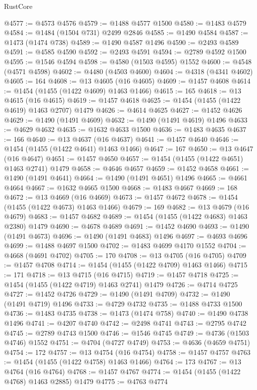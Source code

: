 \begin{lexlean}{RustCore}
\begin{coremodule}
@4577 := @4573 @4576
@4579 := @1488 @4577 @1500
@4580 := @1483 @4579
@4584 := @1484 (@1504 @731) @2499 @2846
@4585 := @1490 @4584
@4587 := @1473 (@1474 @738)
@4589 := @1490 @4587 @1496
@4590 := @2493 @4589
@4591 := @4585 @4590
@4592 := @2493 @4591
@4594 := @2789 @4592 @1500
@4595 := @1546 @4594
@4598 := @4580 (@1503 @4595) @1552
@4600 := @4548 (@4571 @4598)
@4602 := @4480 (@4503 @4600)
@4604 := @4318 (@4341 @4602)
@4605 := 164
@4608 := @13 @4605 (@16 @4605)
@4609 := @1457 @4608
@4614 := @1454 (@1455 (@1422 @4609) @1463 @1466)
@4615 := 165
@4618 := @13 @4615 (@16 @4615)
@4619 := @1457 @4618
@4625 := @1454 (@1455 (@1422 @4619) @1463 @2707) @1479
@4626 := @4614 @4625
@4627 := @1452 @4626
@4629 := @1490 (@1491 @4609)
@4632 := @1490 (@1491 @4619) @1496
@4633 := @4629 @4632
@4635 := @1632 @4633 @1500
@4636 := @1483 @4635
@4637 := 166
@4640 := @13 @4637 (@16 @4637)
@4641 := @1457 @4640
@4646 := @1454 (@1455 (@1422 @4641) @1463 @1466)
@4647 := 167
@4650 := @13 @4647 (@16 @4647)
@4651 := @1457 @4650
@4657 := @1454 (@1455 (@1422 @4651) @1463 @2741) @1479
@4658 := @4646 @4657
@4659 := @1452 @4658
@4661 := @1490 (@1491 @4641)
@4664 := @1490 (@1491 @4651) @1496
@4665 := @4661 @4664
@4667 := @1632 @4665 @1500
@4668 := @1483 @4667
@4669 := 168
@4672 := @13 @4669 (@16 @4669)
@4673 := @1457 @4672
@4678 := @1454 (@1455 (@1422 @4673) @1463 @1466)
@4679 := 169
@4682 := @13 @4679 (@16 @4679)
@4683 := @1457 @4682
@4689 := @1454 (@1455 (@1422 @4683) @1463 @2380) @1479
@4690 := @4678 @4689
@4691 := @1452 @4690
@4693 := @1490 (@1491 @4673)
@4696 := @1490 (@1491 @4683) @1496
@4697 := @4693 @4696
@4699 := @1488 @4697 @1500
@4702 := @1483 @4699 @4170 @1552
@4704 := @4668 (@4691 @4702)
@4705 := 170
@4708 := @13 @4705 (@16 @4705)
@4709 := @1457 @4708
@4714 := @1454 (@1455 (@1422 @4709) @1463 @1466)
@4715 := 171
@4718 := @13 @4715 (@16 @4715)
@4719 := @1457 @4718
@4725 := @1454 (@1455 (@1422 @4719) @1463 @2741) @1479
@4726 := @4714 @4725
@4727 := @1452 @4726
@4729 := @1490 (@1491 @4709)
@4732 := @1490 (@1491 @4719) @1496
@4733 := @4729 @4732
@4735 := @1488 @4733 @1500
@4736 := @1483 @4735
@4738 := @1473 (@1474 @758)
@4740 := @1490 @4738 @1496
@4741 := @4207 @4740
@4742 := @2498 @4741
@4743 := @2795 @4742
@4745 := @2789 @4743 @1500
@4746 := @1546 @4745
@4749 := @4736 (@1503 @4746) @1552
@4751 := @4704 (@4727 @4749)
@4753 := @4636 (@4659 @4751)
@4754 := 172
@4757 := @13 @4754 (@16 @4754)
@4758 := @1457 @4757
@4763 := @1454 (@1455 (@1422 @4758) @1463 @1466)
@4764 := 173
@4767 := @13 @4764 (@16 @4764)
@4768 := @1457 @4767
@4774 := @1454 (@1455 (@1422 @4768) @1463 @2885) @1479
@4775 := @4763 @4774

\end{coremodule}
\end{lexlean}

